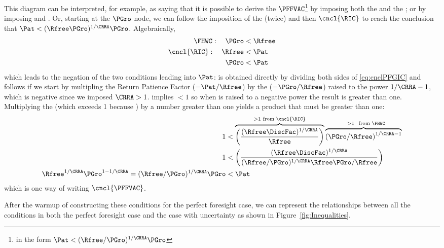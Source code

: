 \documentclass[\econtexRoot/BufferStockTheory]{subfiles}
\begin{document}
This diagram can be interpreted, for example, as saying  that it is possible to derive the $\PFFVAC$\footnote{in the form $\Pat < (\Rfree/\PGro)^{1/\CRRA}\PGro$} by imposing both the {\PFGIC} and the {\FHWC}; or by imposing {\RIC} and \cncl{\FHWC}.  Or, starting at the $\PGro$ node, we can follow the imposition of the {\FHWC} (twice) and then $\cncl{\RIC}$ to reach the conclusion that $\Pat < (\Rfree \PGro)^{1/\CRRA} \PGro$.  Algebraically,
\begin{equation}\begin{gathered}\begin{aligned}
  {\FHWC}:~~~ \PGro & < \Rfree \notag
  \\ \cncl{\RIC}:~~~ \Rfree & < \Pat \notag
  \\ \PGro & < \Pat \label{eq:cnclPFGIC}
\end{aligned}\end{gathered}\end{equation}
which leads to the negation of the two conditions leading into $\Pat$: \cncl{\PFGIC} is obtained directly by dividing both sides of \eqref{eq:cnclPFGIC} and \cncl{\PFFVAC} follows if we start by multipling the Return Patience Factor ({\RPF}=$\Pat/\Rfree$) by the \FHWF (=$\PGro/\Rfree$) raised to the power $1/\CRRA-1$, which is negative since we imposed $\CRRA > 1$.  {\FHWC} implies {\FHWF} $< 1$ so when {\FHWF} is raised to a negative power the result is greater than one.
Multiplying the \RPF (which exceeds 1 because \cncl{\RIC}) by a number greater than one yields a product that must be greater than one:
\begin{equation}\begin{gathered}\begin{aligned}
  1  & < \overbrace{\left(\frac{(\Rfree \DiscFac)^{1/\CRRA}}{\Rfree}\right)}^{>1 \text{~from~}\cncl{\RIC}}\overbrace{\left(\PGro/\Rfree\right)^{1/\CRRA-1}}^{\phantom{...}>1~\text{~from~} \FHWC} \notag
  \\ 1  & < \left(\frac{(\Rfree \DiscFac)^{1/\CRRA}}{(\Rfree/\PGro)^{1/\CRRA}\Rfree\PGro/\Rfree}\right) \label{eq:cnclFHWFAndcnclRICImplycnclPFFVAC}
  \\ \Rfree^{1/\CRRA}\PGro^{1 - 1/\CRRA} = (\Rfree/\PGro)^{1/\CRRA} \PGro  & < \Pat \notag
\end{aligned}\end{gathered}\end{equation}
which is one way of writing $\cncl{\PFFVAC}$.

After the warmup of constructing these conditions for the perfect foresight case, we can represent the relationships between all the conditions in both the perfect foresight case and the case with uncertainty as shown in Figure~\ref{fig:Inequalities}.
\end{document}
